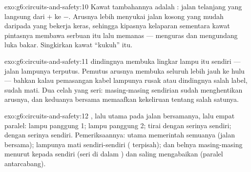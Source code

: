 \begin{solution}{exo:g6:circuits-and-safety:10}
Kawat tambahannya adalah : jalan telanjang yang langsung
dari $+$ ke $-$. Arusnya lebih menyukai jalan kosong yang mudah
daripada  yang bekerja keras, sehingga kipasnya kelaparan
sementara kawat pintasnya membawa serbuan itu lalu memanas ---
menguras  dan mengundang luka bakar. Singkirkan kawat
``kukuh'' itu.
\end{solution}

\begin{solution}{exo:g6:circuits-and-safety:11}
 dindingnya membuka lingkar lampu itu sendiri --- jalan lampunya
terputus. Pemutus arusnya membuka seluruh  lebih jauh ke hulu
--- bahkan kalau pemasangan kabel lampunya rusak atau 
dindingnya salah label,  sudah mati. Dua celah yang seri:
masing-masing sendirian sudah menghentikan arusnya, dan keduanya
bersama memaafkan kekeliruan tentang salah satunya.
\end{solution}

\begin{solution}{exo:g6:circuits-and-safety:12}
, lalu  utama pada jalan bersamanya, lalu empat 
paralel: lampu panggung 1; lampu panggung 2;  tirai dengan
 serinya sendiri;  dengan  serinya sendiri.
Pemeriksaannya:  utama memerintah semuanya (jalan bersama);
lampunya mati sendiri-sendiri ( terpisah);  dan belnya
masing-masing menurut kepada  sendiri (seri di dalam
) dan saling mengabaikan (paralel antarcabang).
\end{solution}

